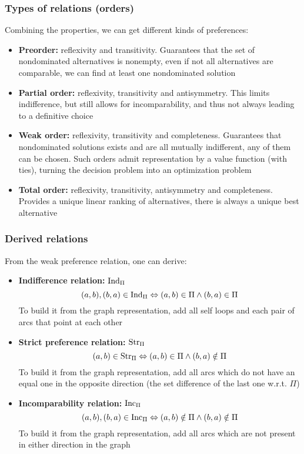 \subsubsection{Types of relations (orders)}

Combining the properties, we can get different kinds of preferences: 
\begin{itemize}
	\item \textbf{Preorder:} reflexivity and transitivity. Guarantees that the set of nondominated alternatives is nonempty, even if not all alternatives are comparable, we can find at least one nondominated solution
	
	\item \textbf{Partial order:} reflexivity, transitivity and antisymmetry. This limits indifference, but still allows for incomparability, and thus not always leading to a definitive choice
	
	\item \textbf{Weak order:} reflexivity, transitivity and completeness. Guarantees that nondominated solutions exists and are all mutually indifferent, any of them can be chosen. Such orders admit representation by a value function (with ties), turning the decision problem into an optimization problem
	
	\item \textbf{Total order:} reflexivity, transitivity, antisymmetry and completeness. Provides a unique linear ranking of alternatives, there is always a unique best alternative
\end{itemize}

\subsubsection{Derived relations}

From the weak preference relation, one can derive: 
\begin{itemize}
	\item \textbf{Indifference relation:} $\text{Ind}_{\Pi}$
	$$ (a,b),(b,a) \in \text{Ind}_{\Pi} \Leftrightarrow (a,b) \in \Pi \wedge (b,a) \in \Pi $$
	To build it from the graph representation, add all self loops and each pair of arcs that point at each other
	
	\item \textbf{Strict preference relation:} $\text{Str}_{\Pi}$
	$$ (a,b) \in \text{Str}_{\Pi} \Leftrightarrow (a,b) \in \Pi \wedge (b,a) \notin \Pi $$
	To build it from the graph representation, add all arcs which do not have an equal one in the opposite direction (the set difference of the last one w.r.t. $\Pi$)
	
	\item \textbf{Incomparability relation:} $\text{Inc}_{\Pi}$
	$$ (a,b), (b,a) \in \text{Inc}_{\Pi} \Leftrightarrow (a,b) \notin \Pi \wedge (b,a) \notin \Pi $$
	To build it from the graph representation, add all arcs which are not present in either direction in the graph
\end{itemize}